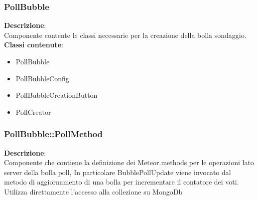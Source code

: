 \subsubsection{PollBubble}
   \FloatBarrier
\FloatBarrier
\textbf{Descrizione}:\\
 Componente contente le classi necessarie per la creazione della bolla sondaggio. 
\\ \textbf{Classi contenute}:\\
\begin{itemize}
\item PollBubble
\item PollBubbleConfig
\item PollBubbleCreationButton
\item PollCreator
\end{itemize}


\clearpage

\subsubsection{PollBubble::PollMethod}
\textbf{Descrizione}:\\
 Componente che contiene la definizione dei Meteor.methods per le operazioni lato server della bolla poll,  In particolare BubblePollUpdate viene invocato dal metodo di aggiornamento di una bolla per incrementare il contatore dei voti. Utilizza direttamente l'accesso alla collezione su MongoDb 


